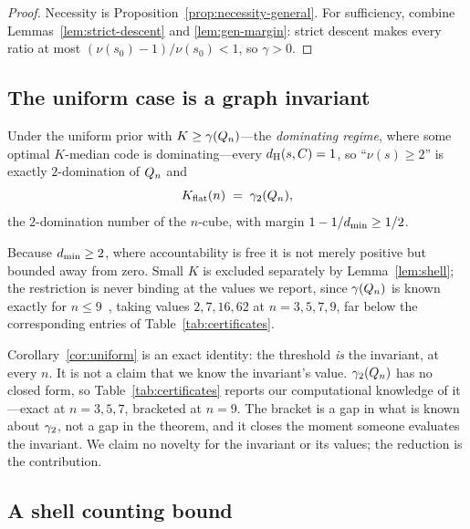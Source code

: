 \begin{proof}
Necessity is Proposition~\ref{prop:necessity-general}. For sufficiency, combine
Lemmas~\ref{lem:strict-descent} and \ref{lem:gen-margin}: strict descent makes
every ratio at most $(\nu(s_0)-1)/\nu(s_0) < 1$, so $\gamma > 0$.
\end{proof}

\subsection{The uniform case is a graph invariant}

\begin{corollary}
\label{cor:uniform}
Under the uniform prior with $K \ge \gamma(Q_n)$---the \emph{dominating regime},
where some optimal $K$-median code is dominating---every $d_{\mathrm{H}}(s,C) = 1$, so
``$\nu(s) \ge 2$'' is exactly $2$-domination of $Q_n$ and
\[
  K_{\mathrm{flat}}(n) \;=\; \gamma_2(Q_n),
\]
the $2$-domination number of the $n$-cube, with margin
$1 - 1/d_{\min} \ge 1/2$.
\end{corollary}

Because $d_{\min} \ge 2$, where accountability is free it is not merely positive but
bounded away from zero. Small $K$ is excluded separately by
Lemma~\ref{lem:shell}; the restriction is never binding at the values we report,
since $\gamma(Q_n)$ is known exactly for $n \le 9$~\cite{ostergardblass2001},
taking values $2, 7, 16, 62$ at $n = 3,5,7,9$, far below the corresponding
entries of Table~\ref{tab:certificates}.

\begin{remark}
\label{rem:exactness}
Corollary~\ref{cor:uniform} is an exact identity: the threshold \emph{is} the
invariant, at every $n$. It is not a claim that we know the invariant's value.
$\gamma_2(Q_n)$ has no closed form, so Table~\ref{tab:certificates} reports our
computational knowledge of it---exact at $n = 3,5,7$, bracketed at $n = 9$. The
bracket is a gap in what is known about $\gamma_2$, not a gap in the theorem, and it
closes the moment someone evaluates the invariant. We claim no novelty for the
invariant or its values; the reduction is the contribution.
\end{remark}

\subsection{A shell counting bound}
\label{sec:shell}

